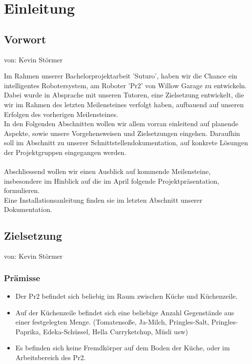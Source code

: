 \documentclass{suturo}
\begin{document}

\makeatletter
\newcommand{\chapterauthor}[1]{%
  {\parindent0pt\vspace*{-27pt}%
  \linespread{0}\small\begin{flushright}von: #1\end{flushright}%
  \par\nobreak\vspace*{0pt}}
  \@afterheading%
}
\makeatother


\section{Einleitung}
\subsection{Vorwort}
\chapterauthor{Kevin Störmer}
Im Rahmen unserer Bachelorprojektarbeit 'Suturo', haben wir die Chance ein intelligentes Robotersystem, am Roboter 'Pr2' von Willow Garage zu entwickeln. \\
Dabei wurde in Absprache mit unseren Tutoren, eine Zielsetzung entwickelt, die wir im Rahmen des letzten Meilensteines verfolgt haben, aufbauend auf unseren Erfolgen des vorherigen Meilensteines. \\
In den Folgenden Abschnitten wollen wir allem vorran einleitend auf planende Aspekte, sowie unsere Vorgehensweisen und Zielsetzungen eingehen. Daraufhin soll im Abschnitt zu unserer Schnittstellendokumentation, auf konkrete Lösungen der Projektgruppen eingegangen werden.\\ ~ \\
Abschliessend wollen wir einen Ausblick auf kommende Meilensteine, insbesondere im Hinblick auf die im April folgende Projektpräsentation, formulieren.\\
Eine Installationsanleitung finden sie im letzten Abschnitt unserer Dokumentation.

\newpage

\subsection{Zielsetzung}
\chapterauthor{Kevin Störmer}
\subsubsection{Prämisse}
\begin{itemize}
\item Der Pr2 befindet sich beliebig im Raum zwischen Küche und Küchenzeile.
\item Auf der Küchenzeile befindet sich eine beliebige Anzahl Gegenstände aus einer festgelegten Menge. (Tomatensoße, Ja-Milch, Pringles-Salt, Pringles-Paprika, Edeka-Schüssel, Hella Curryketchup, Müsli usw)
\item Es befinden sich keine Fremdkörper auf dem Boden der Küche, oder im Arbeitsbereich des Pr2.
\end{itemize}
\end{document}
